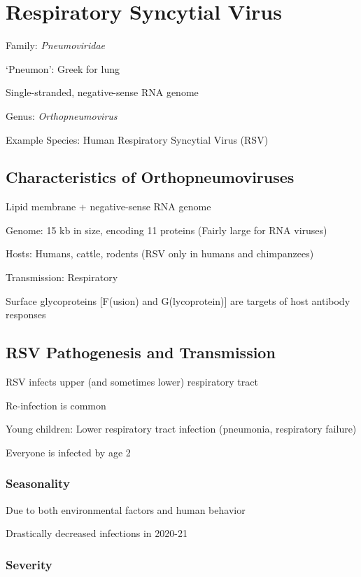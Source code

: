 \documentclass{notes}
\begin{document}
\section{Respiratory Syncytial Virus}

Family: \textit{Pneumoviridae}

\tab `Pneumon': Greek for lung

\tab Single-stranded, negative-sense RNA genome

Genus: \textit{Orthopneumovirus}

\tab Example Species: Human Respiratory Syncytial Virus (RSV)

\subsection{Characteristics of Orthopneumoviruses}

Lipid membrane + negative-sense RNA genome

Genome: 15 kb in size, encoding 11 proteins (Fairly large for RNA viruses)

Hosts: Humans, cattle, rodents (RSV only in humans and chimpanzees)

Transmission: Respiratory

Surface glycoproteins [F(usion) and G(lycoprotein)] are targets of host antibody responses

\subsection{RSV Pathogenesis and Transmission}

RSV infects upper (and sometimes lower) respiratory tract

\tab Re-infection is common

Young children: Lower respiratory tract infection (pneumonia, respiratory failure)

\tab Everyone is infected by age 2

\subsubsection{Seasonality}

Due to both environmental factors and human behavior

\tab Drastically decreased infections in 2020-21

\subsubsection{Severity}
\end{document}
